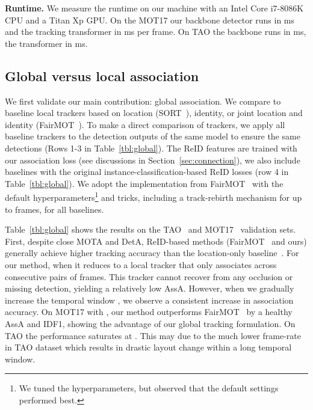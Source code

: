 \documentclass[10pt,twocolumn,letterpaper]{article}
\let\oldsubsection\subsection
\renewcommand{\subsection}[1]{\vspace{-1mm}\oldsubsection{#1}\vspace{-1mm}}
\newcommand{\refsec}[1]{Section~\ref{sec:#1}}
\newcommand{\reftbl}[1]{Table~\ref{tbl:#1}}
\newcommand{\lblsec}[1]{\label{sec:#1}}
\newcommand{\rowNumber}[1]{\textcolor{Cerulean}{#1}}
\begin{document}
\par \noindent \textbf{Runtime.}
We measure the runtime on our machine with an Intel Core i7-8086K CPU and a Titan Xp GPU.
On the MOT17 our backbone detector runs in ms and the tracking transformer in ms per frame. On TAO the backbone runs in ms, the transformer in ms.


\subsection{Global versus local association}
\lblsec{global}
We first validate our main contribution: global association.
We compare to baseline local trackers based on location (SORT~\cite{Bewley2016_sort}), identity, or joint location and identity (FairMOT~\cite{zhang2020fair}).
To make a direct comparison of trackers,
we apply all baseline trackers to the detection outputs of the same model to ensure the same detections (Rows \rowNumber{1-3} in \reftbl{global}).
The ReID features are trained with our association loss (see discussions in \refsec{connection}), we also include baselines with the original instance-classification-based ReID losses (row \rowNumber{4} in \reftbl{global}). 
We adopt the implementation from FairMOT~\cite{zhang2020fair} with the default hyperparameters\footnote{We tuned the hyperparameters, but observed that the default settings performed best.} and tricks,
including a track-rebirth mechanism for up to  frames, for all baselines.


\reftbl{global} shows the results on the TAO~\cite{dave2020tao} and MOT17~\cite{MOT16} validation sets.
First, despite close MOTA and DetA, ReID-based methods (FairMOT~\cite{zhang2020fair} and ours) generally achieve higher tracking accuracy than the location-only baseline~\cite{Bewley2016_sort}.
For our method, when  it reduces to a local tracker that only associates across consecutive pairs of frames.
This tracker cannot recover from any occlusion or missing detection, yielding a relatively low AssA.
However, when we gradually increase the temporal window , we observe a consistent increase in association accuracy.
On MOT17 with , our method outperforms FairMOT~\cite{zhang2020fair} by a healthy  AssA and  IDF1, showing the advantage of our global tracking formulation.
On TAO the performance saturates at .
This may due to the much lower frame-rate in TAO dataset which results in drastic layout change within a long temporal window.
\end{document}
